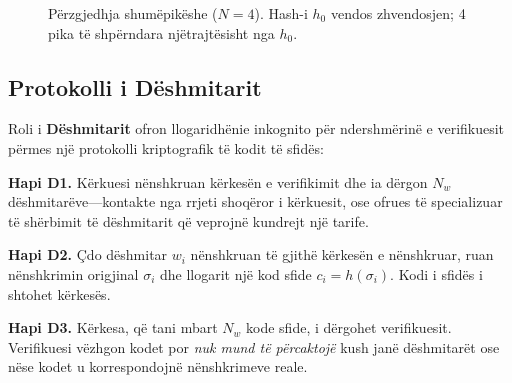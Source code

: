 \documentclass[11pt,a4paper,twocolumn]{article}
\begin{document}
\begin{figure}[ht]
\centering
{}
\caption{Përzgjedhja shumëpikëshe ($N{=}4$). Hash-i $h_0$ vendos zhvendosjen; 4 pika të shpërndara njëtrajtësisht nga $h_0$.}
\label{fig:multipoint}
\end{figure}

\subsection{Protokolli i Dëshmitarit}

Roli i \textbf{Dëshmitarit} ofron llogaridhënie inkognito për ndershmërinë e verifikuesit përmes një protokolli kriptografik të kodit të sfidës:

\textbf{Hapi D1.} Kërkuesi nënshkruan kërkesën e verifikimit dhe ia dërgon $N_w$ dëshmitarëve---kontakte nga rrjeti shoqëror i kërkuesit, ose ofrues të specializuar të shërbimit të dëshmitarit që veprojnë kundrejt një tarife.

\textbf{Hapi D2.} Çdo dëshmitar $w_i$ nënshkruan të gjithë kërkesën e nënshkruar, ruan nënshkrimin origjinal $\sigma_i$ dhe llogarit një kod sfide $c_i = h(\sigma_i)$. Kodi i sfidës i shtohet kërkesës.

\textbf{Hapi D3.} Kërkesa, që tani mbart $N_w$ kode sfide, i dërgohet verifikuesit. Verifikuesi vëzhgon kodet por \emph{nuk mund të përcaktojë} kush janë dëshmitarët ose nëse kodet u korrespondojnë nënshkrimeve reale.
\end{document}
